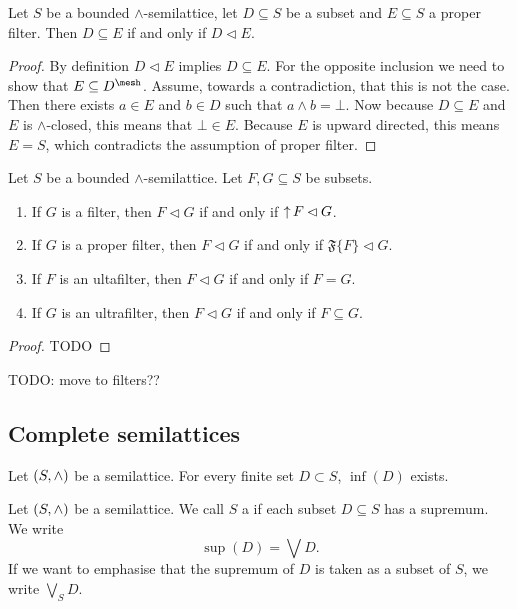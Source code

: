 \begin{proposition} \label{containmentInclusionProperFilter}
Let $S$ be a bounded $\wedge$-semilattice, let $D \subseteq S$ be a subset and $E\subseteq S$ a proper filter. Then $D\subseteq E$ \textup{if and only if} $D\lhd E$.
\end{proposition}
\begin{proof}
By definition $D\lhd E$ implies $D\subseteq E$. For the opposite inclusion we need to show that $E\subseteq D^{\mesh}$. Assume, towards a contradiction, that this is not the case. Then there exists $a\in E$ and $b\in D$ such that $a\wedge b = \bot$. Now because $D\subseteq E$ and $E$ is $\wedge$-closed, this means that $\bot\in E$. Because $E$ is upward directed, this means $E = S$, which contradicts the assumption of proper filter.
\end{proof}

\begin{lemma} \label{ultrafilterContainment}
Let $S$ be a bounded $\wedge$-semilattice. Let $F,G\subseteq S$ be subsets.
\begin{enumerate}
\item If $G$ is a filter, then $F\lhd G$ \textup{if and only if} $\operatorname{\uparrow} F \lhd G$.
\item If $G$ is a proper filter, then $F\lhd G$ \textup{if and only if} $\mathfrak{F}\{F\} \lhd G$.
\item If $F$ is an ultafilter, then $F\lhd G$ \textup{if and only if} $F = G$.
\item If $G$ is an ultrafilter, then $F \lhd G$ \textup{if and only if} $F\subseteq G$.
\end{enumerate}
\end{lemma}
\begin{proof}
TODO
\end{proof}
TODO: move to filters??

\subsection{Complete semilattices}
\begin{lemma}
Let $\left( S,\wedge \right)$ be a semilattice. For every finite set $D\subset S$, $\inf(D)$ exists.
\end{lemma}
\begin{definition}
Let $\left( S,\wedge \right)$ be a semilattice. We call $S$ a  if each subset $D\subseteq S$ has a supremum. We write
\[ \sup(D) = \bigvee D. \]
If we want to emphasise that the supremum of $D$ is taken as a subset of $S$, we write $\bigvee_S D$.
\end{definition}

